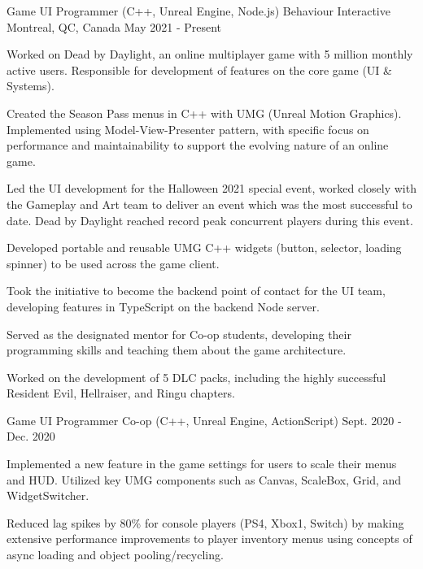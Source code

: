 

\begin{cventries}

  \cventry
    {Game UI Programmer (C++, Unreal Engine, Node.js)} %
    {Behaviour Interactive} %
    {Montreal, QC, Canada} %
    {May 2021 - Present} %
    {
      \begin{cvitems} %
\item Worked on Dead by Daylight, an online multiplayer game with 5 million monthly active users. Responsible for development of features on the core game (UI \& Systems). 
\item Created the Season Pass menus in C++ with UMG (Unreal Motion Graphics). Implemented using Model-View-Presenter pattern, with specific focus on performance and maintainability to support the evolving nature of an online game.
\item Led the UI development for the Halloween 2021 special event, worked closely with the Gameplay and Art team to deliver an event which was the most successful to date. Dead by Daylight reached record peak concurrent players during this event.
\item Developed portable and reusable UMG C++ widgets (button, selector, loading spinner) to be used across the game client.
\item Took the initiative to become the backend point of contact for the UI team, developing features in TypeScript on the backend Node server. 
\item Served as the designated mentor for Co-op students, developing their programming skills and teaching them about the game architecture.
\item Worked on the development of 5 DLC packs, including the highly successful Resident Evil, Hellraiser, and Ringu chapters.
      \end{cvitems}
    }

  \cventry
    {Game UI Programmer Co-op (C++, Unreal Engine, ActionScript)} %
    {} %
    {} %
    {Sept. 2020 - Dec. 2020} %
    {
      \begin{cvitems} %
\item Implemented a new feature in the game settings for users to scale their menus and HUD. Utilized key UMG components such as Canvas, ScaleBox, Grid, and WidgetSwitcher.
\item Reduced lag spikes by 80\% for console players (PS4, Xbox1, Switch) by making extensive performance improvements to player inventory menus using concepts of async loading and object pooling/recycling.
      \end{cvitems}
    }


\end{cventries}
